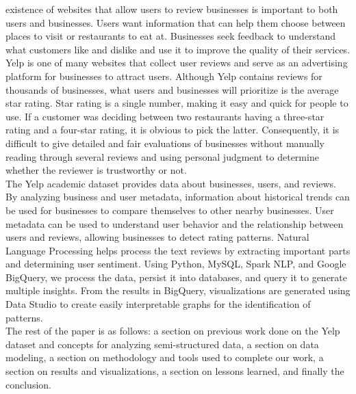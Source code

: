 \documentclass[11pt,journal,compsoc]{IEEEtran}
\begin{document}
% 
% 
% 
 existence of websites that allow users to review businesses is important to both users and businesses. Users want information that can help them choose between places to visit or restaurants to eat at. Businesses seek feedback to understand what customers like and dislike and use it to improve the quality of their services. Yelp is one of many websites that collect user reviews and serve as an advertising platform for businesses to attract users. Although Yelp contains reviews for thousands of businesses, what users and businesses will prioritize is the average star rating. Star rating is a single number, making it easy and quick for people to use. If a customer was deciding between two restaurants having a three-star rating and a four-star rating, it is obvious to pick the latter. Consequently, it is difficult to give detailed and fair evaluations of businesses without manually reading through several reviews and using personal judgment to determine whether the reviewer is trustworthy or not. \\
\indent The Yelp academic dataset provides data about businesses, users, and reviews. By analyzing business and user metadata, information about historical trends can be used for businesses to compare themselves to other nearby businesses. User metadata can be used to understand user behavior and the relationship between users and reviews, allowing businesses to detect rating patterns. Natural Language Processing helps process the text reviews by extracting important parts and determining user sentiment. Using Python, MySQL, Spark NLP, and Google BigQuery, we process the data, persist it into databases, and query it to generate multiple insights. From the results in BigQuery, visualizations are generated using Data Studio to create easily interpretable graphs for the identification of patterns. \\
\indent The rest of the paper is as follows: a section on previous work done on the Yelp dataset and concepts for analyzing semi-structured data, a section on data modeling, a section on methodology and tools used to complete our work, a section on results and visualizations, a section on lessons learned, and finally the conclusion.
\end{document}
